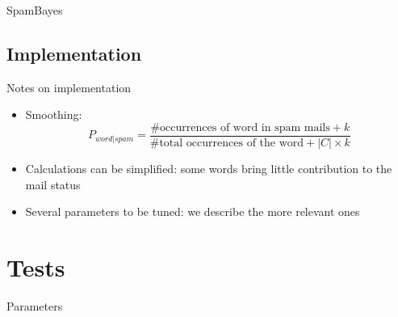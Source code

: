\documentclass[xcolor=x11names,compress]{beamer}
\renewcommand{\(}{\begin{columns}}
\renewcommand{\)}{\end{columns}}
\newcommand{\<}[1]{\begin{column}{#1}}
\renewcommand{\>}{\end{column}}
\begin{document}

\begin{frame}{SpamBayes}
  \begin{center}
  \end{center}
\end{frame}

\subsection{Implementation}
\begin{frame}{Notes on implementation}
\begin{itemize}
    \item<1->Smoothing:
      $$P_{word|spam} = \frac{\mbox{\# occurrences of word in spam mails} + k}{\mbox{\# total occurrences of the word} + |C|\times k}$$
    \item<2->Calculations can be simplified: some words bring little contribution to the mail status
    \item<3->Several parameters to be tuned: we describe the more relevant ones
\end{itemize}
\end{frame}

\section{Tests}
\begin{frame}{Parameters}
\end{frame}
\end{document}
